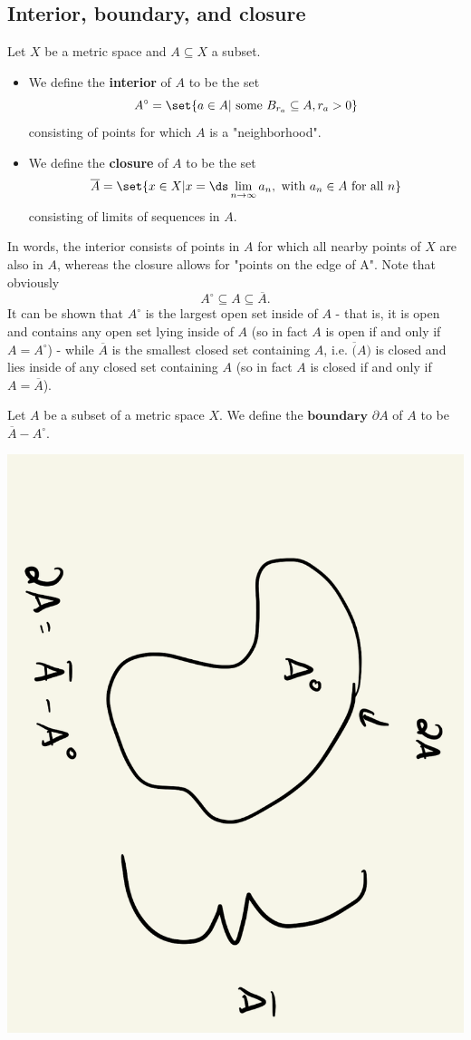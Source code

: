 \documentclass{article} %
\newcommand{\interior}[1]{{#1}^\circ}
\begin{document}
\subsection{Interior, boundary, and closure \footnotemark} 

\begin{definitions}
Let $X$ be a metric space and $A \subseteq X$ a subset.  
\begin{itemize}
\item We define the \textbf{interior} of $A$ to be the set
\[\interior{A} = \set{a \in A | \text{ some } B_{r_a} \subseteq A, r_a > 0} \]
consisting of points for which $A$ is a "neighborhood". 
\item We define the \textbf{closure} of $A$ to be the set 
\[ \overline{A} = \set{x \in X | x = \ds\lim_{n \to \infty} a_n, \text{ with } a_n \in A \text{ for all } n} \]
consisting of limits of sequences in $A$. 	
\end{itemize}
\end{definitions}

\begin{remark}{}
In words, the interior consists of points in $A$ for which all nearby points of $X$ are also in $A$, whereas the closure allows for "points on the edge of A".  Note that obviously
\[ \interior{A} \subseteq A \subseteq \overline{A}. \]
It can be shown that $\interior{A}$ is the largest open set inside of $A$ - that is, it is open and contains any open set lying inside of $A$ (so in fact $A$ is open if and only if $A = \interior{A}$) - while $\overline{A}$ is the smallest closed set containing $A$, i.e. $\overline(A)$ is closed and lies inside of any closed set containing $A$ (so in fact $A$ is closed if and only if $A = \overline{A}$). 
\end{remark}

\begin{definition}
Let $A$ be a subset of a metric space $X$.  We define the $\textbf{boundary}$ $\partial A$ of $A$ to be $\overline{A} - \interior{A}$.	
\end{definition}

\begin{center}
\includegraphics[angle=90,width=.3\linewidth]{images/boundary_closure_and_interior}	
\end{center}
\end{document}
